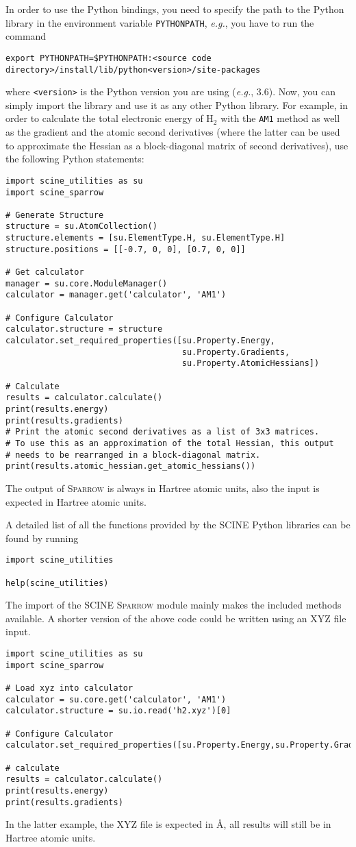 \documentclass[]{tufte-book}
\begin{document}
In order to use the Python bindings, you need to specify the path to the Python library in the environment variable
\texttt{PYTHONPATH}, \textit{e.g.}, you have to run the command
\begin{verbatim}
export PYTHONPATH=$PYTHONPATH:<source code directory>/install/lib/python<version>/site-packages
\end{verbatim}
where \texttt{<version>} is the Python version you are using (\textit{e.g.}, 3.6). Now, you can simply import the library 
and use it as any other Python library. For example, in order to calculate the total electronic energy of H$_2$ with the 
\texttt{AM1} method as well as the gradient and the atomic second derivatives (where the latter can be used to approximate the Hessian as a block-diagonal matrix of second derivatives), use the following Python statements:
\begin{verbatim}
import scine_utilities as su
import scine_sparrow

# Generate Structure
structure = su.AtomCollection()
structure.elements = [su.ElementType.H, su.ElementType.H]
structure.positions = [[-0.7, 0, 0], [0.7, 0, 0]]

# Get calculator
manager = su.core.ModuleManager()
calculator = manager.get('calculator', 'AM1')

# Configure Calculator
calculator.structure = structure
calculator.set_required_properties([su.Property.Energy,
                                    su.Property.Gradients, 
                                    su.Property.AtomicHessians])

# Calculate
results = calculator.calculate()
print(results.energy)
print(results.gradients)
# Print the atomic second derivatives as a list of 3x3 matrices.
# To use this as an approximation of the total Hessian, this output
# needs to be rearranged in a block-diagonal matrix.
print(results.atomic_hessian.get_atomic_hessians())
\end{verbatim}
The output of \textsc{Sparrow} is always in Hartree atomic units, also the input is expected in Hartree atomic units.

A detailed list of all the functions provided by the \textsc{SCINE} Python libraries can be found by running
\begin{verbatim}
import scine_utilities

help(scine_utilities)
\end{verbatim}
The import of the SCINE \textsc{Sparrow} module mainly makes the included methods available.
A shorter version of the above code could be written using an XYZ file input.
\begin{verbatim}
import scine_utilities as su
import scine_sparrow

# Load xyz into calculator
calculator = su.core.get('calculator', 'AM1')
calculator.structure = su.io.read('h2.xyz')[0]

# Configure Calculator
calculator.set_required_properties([su.Property.Energy,su.Property.Gradients])

# calculate
results = calculator.calculate()
print(results.energy)
print(results.gradients)
\end{verbatim}
In the latter example, the XYZ file is expected in \AA{}, all results will still be in Hartree atomic units.
\end{document}
